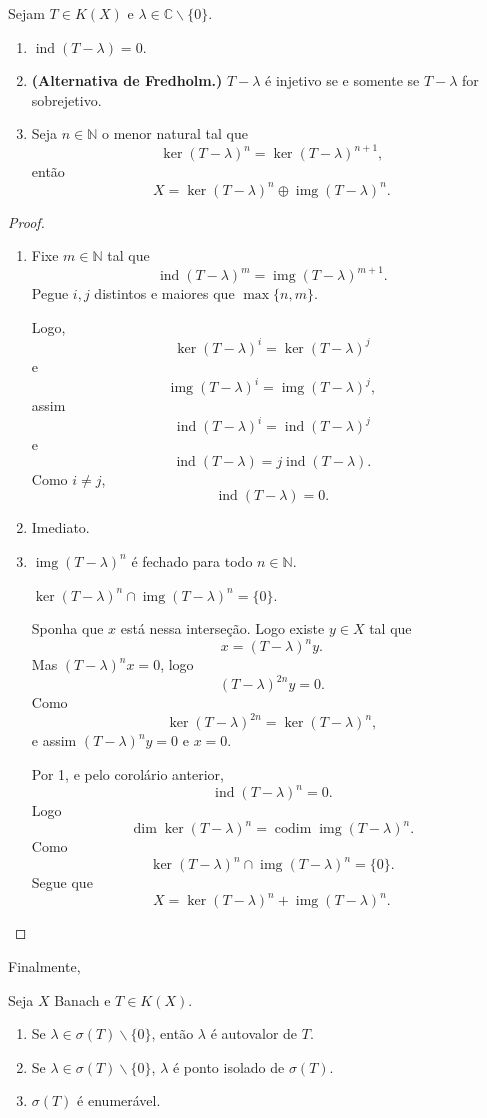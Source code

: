 \documentclass[portuguese]{article}
\theoremstyle{definition}
\newcommand{\N}{\mathbb{N}}
\newcommand{\C}{\mathbb{C}}
\DeclareMathOperator{\img}{img}
\begin{document}
\begin{teo}
	Sejam $T\in K(X)$ e $\lambda\in \C\backslash\{0\}$.
	\begin{enumerate}
		\item $\operatorname{ind}(T-\lambda)=0$.
		\item \textbf{(Alternativa de Fredholm.)} $T-\lambda$ é injetivo se e somente se $T-\lambda$ for sobrejetivo.
		\item Seja $n\in\N$ o menor natural tal que
		\[\ker (T-\lambda)^n=\ker (T-\lambda)^{n+1},\]
		então
		\[X=\ker(T-\lambda)^n\oplus \img(T-\lambda)^n.\]
	\end{enumerate}
\end{teo}
\begin{proof}\leavevmode
	\begin{enumerate}
		\item Fixe $m\in\N$ tal que
		\[\operatorname{ind}(T-\lambda)^m=\img(T-\lambda)^{m+1}.\]
		Pegue $i,j$ distintos e maiores que $\max\{n,m\}$.
		
		Logo,
		\[\ker(T-\lambda)^i=\ker(T-\lambda)^j\]
		e
		\[\img(T-\lambda)^i=\img(T-\lambda)^j,\]
		assim
		\[\operatorname{ind}(T-\lambda)^i=\operatorname{ind}(T-\lambda)^j\]
		e
		\[\operatorname{ind}(T-\lambda)=j\operatorname{ind}(T-\lambda).\]
		Como $i\neq j$,
		\[\operatorname{ind}(T-\lambda)=0.\]
		\item Imediato.
		\item 
		\begin{exer*}
			$\img(T-\lambda)^n$ é fechado para todo $n\in\N$.
		\end{exer*}
		\begin{af*}
			$\ker(T-\lambda)^n\cap\img(T-\lambda)^n=\{0\}$.
		\end{af*}
		Sponha que $x$ está nessa interseção. Logo existe $y\in X$ tal que
		\[x=(T-\lambda)^ny.\]
		Mas $(T-\lambda)^nx=0$, logo
		\[(T-\lambda)^{2n}y=0.\]
		Como
		\[\ker(T-\lambda)^{2n}=\ker(T-\lambda)^n,\]
		e assim $(T-\lambda)^ny=0$ e $x=0$.
		
		Por 1, e pelo corolário anterior,
		\[\operatorname{ind}(T-\lambda)^n=0.\]
		Logo
		\[\dim\ker(T-\lambda)^n=\operatorname{codim}\img (T-\lambda)^n.\]
		Como
		\[\ker(T-\lambda)^n\cap\img(T-\lambda)^n=\{0\}.\]
		Segue que
		\[X=\ker(T-\lambda)^n+\img(T-\lambda)^n.\]
	\end{enumerate}
\end{proof}
Finalmente,
\begin{teo}
	Seja $X$ Banach e $T\in K(X)$.
	\begin{enumerate}
		\item Se $\lambda\in\sigma(T)\backslash\{0\}$, então $\lambda$ é autovalor de $T$.
		\item Se $\lambda\in\sigma(T)\backslash\{0\}$, $\lambda$ é ponto isolado de $\sigma(T)$.
		\item $\sigma(T)$ é enumerável.
	\end{enumerate}
\end{teo}
\end{document}
